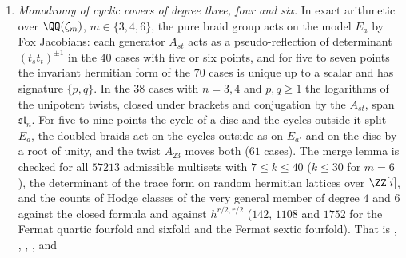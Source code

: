 \begin{enumerate}[label=\textup{(\Roman*)},leftmargin=*]
  transvections are found to preserve the intersection form, to square to
  zero and to generate a Lie algebra of dimension $g(2g+1)$; the chains of
  $2g+1$ cycles have intersection matrices of rank $2g$ for $g\le12$. The
  invariants of $\mathfrak{sp}_{2g}$ in $\bigwedge^{r}$ are a line for $r$
  even and zero for $r$ odd ($g\le4$), and those of $\mathfrak{sl}_{n}$ vanish
  for $0<r<n$ ($n\le6$). For triple covers, the signature $(p,q)$ of an
  eigenspace and the numbers $n_{1}=2p-q+1$, $n_{2}=2q-p+1$ of branch points
  of exponents $1$ and $2$ are checked to agree with the branch data of
  Achter and Pries. On $24$ random hermitian lattices over $\ZZ[\zeta_{3}]$
  the trace form is found to have determinant
  $3^{g}\Nm(c)^{g}(\det M)^{2}$ in absolute value. The dimensions of the
  spaces of Hodge classes of the very general member are enumerated over the
  characters and agree with the closed formulas, never exceed
  $h^{r/2,r/2}$, and equal it for quadrics, for the Fermat cubics ($7$, $21$,
  $71$) and for two quadrics ($N+2$). That is ,
   and .
\item \emph{Monodromy of cyclic covers of degree three, four and six.} In
  exact arithmetic over $\QQ(\zeta_{m})$, $m\in\{3,4,6\}$, the pure braid
  group acts on the model $E_{a}$ by Fox Jacobians: each generator $A_{st}$
  acts as a pseudo-reflection of determinant $(t_{s}t_{t})^{\pm1}$ in the
  $40$ cases with five or six points, and for five to seven points the
  invariant hermitian form of the $70$ cases is unique up to a scalar and
  has signature $\{p,q\}$. In the $38$ cases with $n=3,4$ and $p,q\ge1$ the
  logarithms of the unipotent twists, closed under brackets and conjugation
  by the $A_{st}$, span $\mathfrak{sl}_{n}$. For five to nine points the
  cycle of a disc and the cycles outside it split $E_{a}$, the doubled
  braids act on the cycles outside as on $E_{a'}$ and on the disc by a root
  of unity, and the twist $A_{23}$ moves both ($61$ cases). The merge lemma
  is checked for all $57213$ admissible multisets with $7\le k\le40$
  ($k\le30$ for $m=6$), the determinant of the trace form on random
  hermitian lattices over $\ZZ[i]$, and the counts of Hodge classes of the
  very general member of degree $4$ and $6$ against the closed formula and
  against $h^{r/2,r/2}$ ($142$, $1108$ and $1752$ for the Fermat quartic
  fourfold and sixfold and the Fermat sextic fourfold). That is
  , , ,
  ,  and

\end{enumerate}
